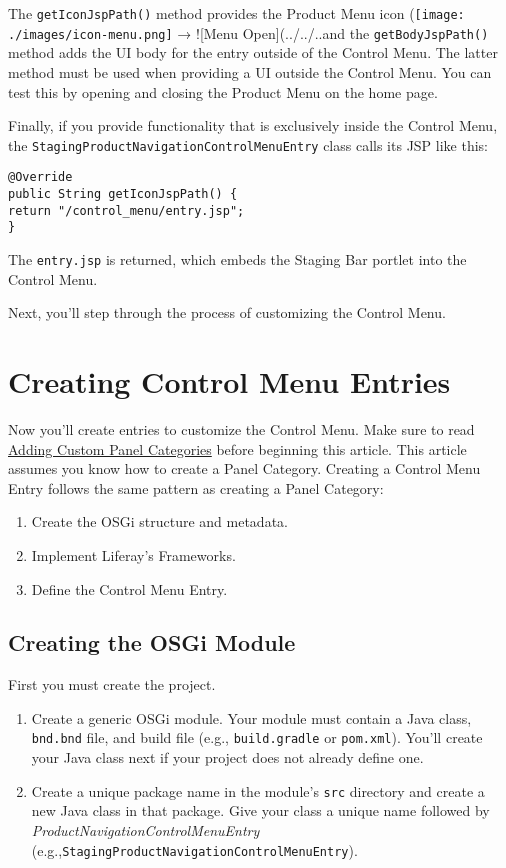 The \texttt{getIconJspPath()} method provides the Product Menu icon
(\texttt{[image: ./images/icon-menu.png]} → !{[}Menu Open{]}(../../..and
the \texttt{getBodyJspPath()} method adds the UI body for the entry
outside of the Control Menu. The latter method must be used when
providing a UI outside the Control Menu. You can test this by opening
and closing the Product Menu on the home page.

Finally, if you provide functionality that is exclusively inside the
Control Menu, the \texttt{StagingProductNavigationControlMenuEntry}
class calls its JSP like this:

\begin{verbatim}
@Override
public String getIconJspPath() {
return "/control_menu/entry.jsp";
}
\end{verbatim}

The \texttt{entry.jsp} is returned, which embeds the Staging Bar portlet
into the Control Menu.

Next, you'll step through the process of customizing the Control Menu.

\chapter{Creating Control Menu
Entries}\label{creating-control-menu-entries}

Now you'll create entries to customize the Control Menu. Make sure to
read
\href{/docs/7-2/customization/-/knowledge_base/c/adding-custom-panel-categories}{Adding
Custom Panel Categories} before beginning this article. This article
assumes you know how to create a Panel Category. Creating a Control Menu
Entry follows the same pattern as creating a Panel Category:

\begin{enumerate}
\def\labelenumi{\arabic{enumi}.}
\item
  Create the OSGi structure and metadata.
\item
  Implement Liferay's Frameworks.
\item
  Define the Control Menu Entry.
\end{enumerate}

\section{Creating the OSGi Module}\label{creating-the-osgi-module-1}

First you must create the project.

\begin{enumerate}
\def\labelenumi{\arabic{enumi}.}
\item
  Create a generic OSGi module. Your module must contain a Java class,
  \texttt{bnd.bnd} file, and build file (e.g., \texttt{build.gradle} or
  \texttt{pom.xml}). You'll create your Java class next if your project
  does not already define one.
\item
  Create a unique package name in the module's \texttt{src} directory
  and create a new Java class in that package. Give your class a unique
  name followed by \emph{ProductNavigationControlMenuEntry}
  (e.g.,\texttt{StagingProductNavigationControlMenuEntry}).
\end{enumerate}

